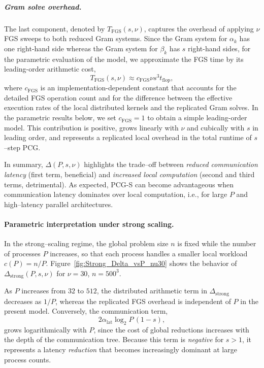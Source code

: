 \documentclass[pdflatex,sn-mathphys-num]{sn-jnl}%
\begin{document}
\subparagraph{Gram solve overhead.}
The last component, denoted by $T_{\mathrm{FGS}}(s,\nu)$, captures
the overhead of applying $\nu$ FGS sweeps to both reduced Gram
systems. Since the Gram system
for $\alpha_k$ has one right-hand side whereas the Gram system for
$\beta_k$ has $s$ right-hand sides, 
for the parametric evaluation of the model, we approximate the FGS
time by its leading-order arithmetic cost,
\[
T_{\mathrm{FGS}}(s,\nu)
\approx
c_{\mathrm{FGS}}\nu s^3t_{\mathrm{flop}},
\]
where $c_{\mathrm{FGS}}$ is an implementation-dependent constant
that accounts for the detailed FGS operation count and for the
difference between the effective execution rates of the local
distributed kernels and the replicated Gram solves. In the
parametric results below, we set $c_{\mathrm{FGS}}=1$ to obtain a
simple leading-order model. This contribution is positive,
grows linearly with $\nu$ and cubically with $s$ in leading order,
and represents a replicated local overhead in the total runtime of
$s$--step PCG. 

\medskip
In summary, \(\Delta(P,s,\nu)\) highlights the trade--off between
\emph{reduced communication latency} (first term, beneficial)
and \emph{increased local computation} (second and third terms, detrimental).
As expected, PCG-S can become advantageous when
communication latency dominates over local computation, i.e., for large \(P\)
and high--latency parallel architectures.

\paragraph{Parametric interpretation under strong scaling.}

In the strong--scaling regime, the global problem size \(n\) is fixed while the number of processes \(P\) increases, so that each process handles a smaller local workload \(c(P)=n/P\).
Figure~\ref{fig:Strong_Delta_vsP_nu30} shows the behavior of
\(\Delta_{\mathrm{strong}}(P,s,\nu)\) for $\nu=30$, $n=500^3$.

As $P$ increases from $32$ to $512$, the distributed arithmetic term
in $\Delta_{\mathrm{strong}}$ decreases as $1/P$, whereas the
replicated FGS overhead is independent of $P$ in the present model.
Conversely, the communication term,
\[
2\alpha_{\mathrm{lat}}\log_2 P\,(1 - s),
\]
grows logarithmically with \(P\), since the cost of global reductions increases with the depth of the communication tree.
Because this term is \emph{negative} for \(s>1\), it represents a latency \emph{reduction} that becomes increasingly dominant at large process counts.
\end{document}
